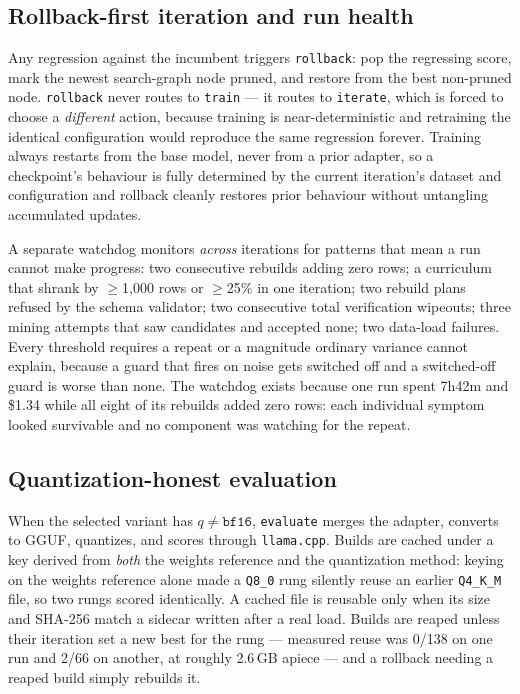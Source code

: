 \documentclass[sigconf,10pt]{acmart}
\begin{document}
\subsection{Rollback-first iteration and run health}

Any regression against the incumbent triggers \texttt{rollback}: pop the regressing score,
mark the newest search-graph node pruned, and restore from the best non-pruned node.
\texttt{rollback} never routes to \texttt{train} --- it routes to \texttt{iterate}, which is
forced to choose a \emph{different} action, because training is near-deterministic and
retraining the identical configuration would reproduce the same regression forever. Training
always restarts from the base model, never from a prior adapter, so a checkpoint's behaviour
is fully determined by the current iteration's dataset and configuration and rollback cleanly
restores prior behaviour without untangling accumulated updates.

A separate watchdog monitors \emph{across} iterations for patterns that mean a run cannot make
progress: two consecutive rebuilds adding zero rows; a curriculum that shrank by
$\ge$1{,}000 rows or $\ge$25\% in one iteration; two rebuild plans refused by the schema
validator; two consecutive total verification wipeouts; three mining attempts that saw
candidates and accepted none; two data-load failures. Every threshold requires a repeat or a
magnitude ordinary variance cannot explain, because a guard that fires on noise gets switched
off and a switched-off guard is worse than none. The watchdog exists because one run spent
7h42m and \$1.34 while all eight of its rebuilds added zero rows: each individual symptom
looked survivable and no component was watching for the repeat.

\subsection{Quantization-honest evaluation}

When the selected variant has $q \ne \texttt{bf16}$, \texttt{evaluate} merges the adapter,
converts to GGUF, quantizes, and scores through \texttt{llama.cpp}. Builds are cached under a
key derived from \emph{both} the weights reference and the quantization method: keying on the
weights reference alone made a \texttt{Q8\_0} rung silently reuse an earlier
\texttt{Q4\_K\_M} file, so two rungs scored identically. A cached file is reusable only when
its size and SHA-256 match a sidecar written after a real load. Builds are reaped unless
their iteration set a new best for the rung --- measured reuse was 0/138 on one run and 2/66
on another, at roughly 2.6\,GB apiece --- and a rollback needing a reaped build simply
rebuilds it.
\end{document}
